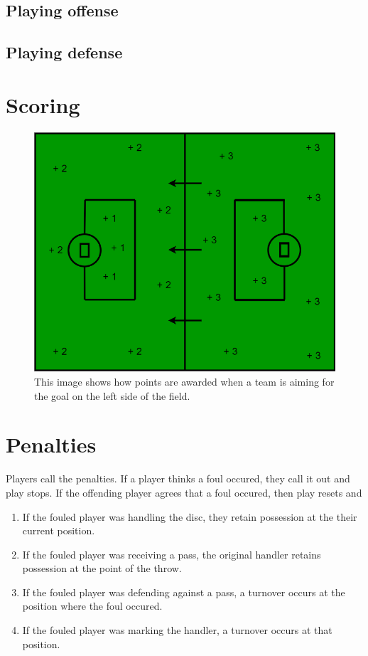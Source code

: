 \documentclass[10pt]{article}
\begin{document}
\subsection{Playing offense}

\subsection{Playing defense}

\section{Scoring}

\begin{figure}[H]

    \includegraphics[width=.75\textwidth]{field/field_points}
    \caption{This image shows how points are awarded when a team is aiming for the goal on the left side of the field.}

\end{figure}

\section{Penalties}

Players call the penalties. If a player thinks a foul occured, they call it out and play stops. If the offending player agrees that a foul occured, then play resets and
\begin{enumerate}
    \item If the fouled player was handling the disc, they retain possession at the their current position.
    \item If the fouled player was receiving a pass, the original handler retains possession at the point of the throw.
    \item If the fouled player was defending against a pass, a turnover occurs at the position where the foul occured.
    \item If the fouled player was marking the handler, a turnover occurs at that position.
\end{enumerate}
\end{document}
